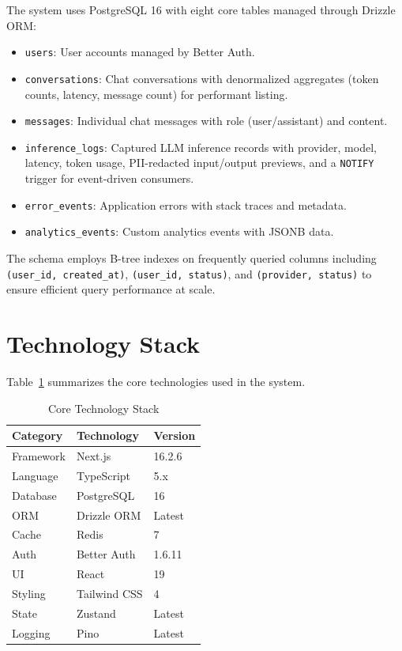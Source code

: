 \documentclass[conference]{IEEEtran}
\begin{document}
The system uses PostgreSQL 16 with eight core tables managed through Drizzle ORM:

\begin{itemize}
  \item \texttt{users}: User accounts managed by Better Auth.
  \item \texttt{conversations}: Chat conversations with denormalized aggregates (token counts, latency, message count) for performant listing.
  \item \texttt{messages}: Individual chat messages with role (user/assistant) and content.
  \item \texttt{inference\_logs}: Captured LLM inference records with provider, model, latency, token usage, PII-redacted input/output previews, and a \texttt{NOTIFY} trigger for event-driven consumers.
  \item \texttt{error\_events}: Application errors with stack traces and metadata.
  \item \texttt{analytics\_events}: Custom analytics events with JSONB data.
\end{itemize}

The schema employs B-tree indexes on frequently queried columns including \texttt{(user\_id, created\_at)}, \texttt{(user\_id, status)}, and \texttt{(provider, status)} to ensure efficient query performance at scale.

\section{Technology Stack}

Table~\ref{tab:techstack} summarizes the core technologies used in the system.

\begin{table}[t]
\centering
\caption{Core Technology Stack}
\label{tab:techstack}
\begin{tabular}{lll}
\toprule
\textbf{Category} & \textbf{Technology} & \textbf{Version} \\
\midrule
Framework & Next.js & 16.2.6 \\
Language & TypeScript & 5.x \\
Database & PostgreSQL & 16 \\
ORM & Drizzle ORM & Latest \\
Cache & Redis & 7 \\
Auth & Better Auth & 1.6.11 \\
UI & React & 19 \\
Styling & Tailwind CSS & 4 \\
State & Zustand & Latest \\
Logging & Pino & Latest \\
\bottomrule
\end{tabular}
\end{table}
\end{document}

